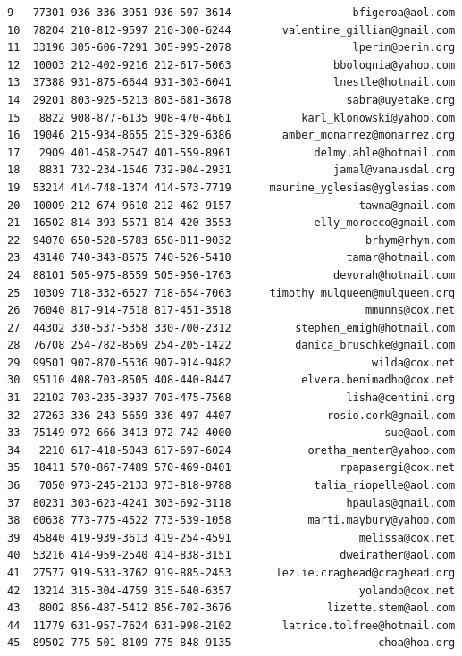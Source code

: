 \documentclass[
  12pt,
]{article}
\begin{document}
\begin{verbatim}
9   77301 936-336-3951 936-597-3614                   bfigeroa@aol.com
10  78204 210-812-9597 210-300-6244        valentine_gillian@gmail.com
11  33196 305-606-7291 305-995-2078                   lperin@perin.org
12  10003 212-402-9216 212-617-5063                bbolognia@yahoo.com
13  37388 931-875-6644 931-303-6041                lnestle@hotmail.com
14  29201 803-925-5213 803-681-3678                  sabra@uyetake.org
15   8822 908-877-6135 908-470-4661           karl_klonowski@yahoo.com
16  19046 215-934-8655 215-329-6386        amber_monarrez@monarrez.org
17   2909 401-458-2547 401-559-8961             delmy.ahle@hotmail.com
18   8831 732-234-1546 732-904-2931                jamal@vanausdal.org
19  53214 414-748-1374 414-573-7719      maurine_yglesias@yglesias.com
20  10009 212-674-9610 212-462-9157                    tawna@gmail.com
21  16502 814-393-5571 814-420-3553             elly_morocco@gmail.com
22  94070 650-528-5783 650-811-9032                     brhym@rhym.com
23  43140 740-343-8575 740-526-5410                  tamar@hotmail.com
24  88101 505-975-8559 505-950-1763                devorah@hotmail.com
25  10309 718-332-6527 718-654-7063      timothy_mulqueen@mulqueen.org
26  76040 817-914-7518 817-451-3518                     mmunns@cox.net
27  44302 330-537-5358 330-700-2312          stephen_emigh@hotmail.com
28  76708 254-782-8569 254-205-1422          danica_bruschke@gmail.com
29  99501 907-870-5536 907-914-9482                      wilda@cox.net
30  95110 408-703-8505 408-440-8447           elvera.benimadho@cox.net
31  22102 703-235-3937 703-475-7568                  lisha@centini.org
32  27263 336-243-5659 336-497-4407               rosio.cork@gmail.com
33  75149 972-666-3413 972-742-4000                        sue@aol.com
34   2210 617-418-5043 617-697-6024            oretha_menter@yahoo.com
35  18411 570-867-7489 570-469-8401                 rpapasergi@cox.net
36   7050 973-245-2133 973-818-9788             talia_riopelle@aol.com
37  80231 303-623-4241 303-692-3118                  hpaulas@gmail.com
38  60638 773-775-4522 773-539-1058            marti.maybury@yahoo.com
39  45840 419-939-3613 419-254-4591                    melissa@cox.net
40  53216 414-959-2540 414-838-3151                 dweirather@aol.com
41  27577 919-533-3762 919-885-2453       lezlie.craghead@craghead.org
42  13214 315-304-4759 315-640-6357                    yolando@cox.net
43   8002 856-487-5412 856-702-3676               lizette.stem@aol.com
44  11779 631-957-7624 631-998-2102        latrice.tolfree@hotmail.com
45  89502 775-501-8109 775-848-9135                       choa@hoa.org

\end{verbatim}
\end{document}
